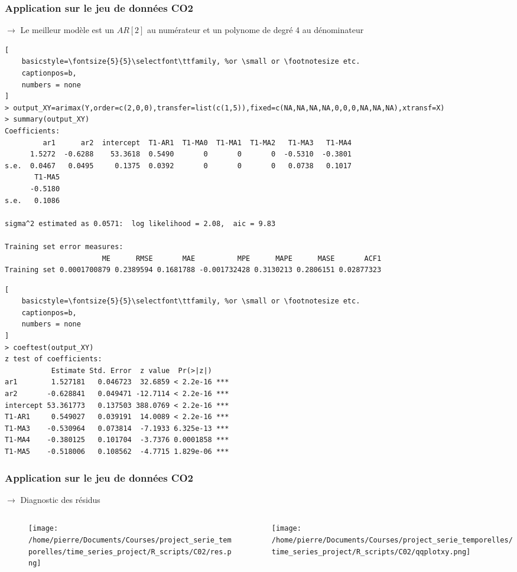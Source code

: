 \documentclass{presentation_template}
\begin{document}
\begin{frame}[fragile]
  \frametitle{Application sur le jeu de données CO2}

  $\rightarrow$ Le meilleur modèle est un $AR[2]$ au numérateur et un polynome de degré 4 au dénominateur
  \begin{lstlisting}[
    basicstyle=\fontsize{5}{5}\selectfont\ttfamily, %or \small or \footnotesize etc.
    captionpos=b,
    numbers = none
]
> output_XY=arimax(Y,order=c(2,0,0),transfer=list(c(1,5)),fixed=c(NA,NA,NA,NA,0,0,0,NA,NA,NA),xtransf=X)
> summary(output_XY)
Coefficients:
         ar1      ar2  intercept  T1-AR1  T1-MA0  T1-MA1  T1-MA2   T1-MA3   T1-MA4
      1.5272  -0.6288    53.3618  0.5490       0       0       0  -0.5310  -0.3801
s.e.  0.0467   0.0495     0.1375  0.0392       0       0       0   0.0738   0.1017
       T1-MA5
      -0.5180
s.e.   0.1086

sigma^2 estimated as 0.0571:  log likelihood = 2.08,  aic = 9.83

Training set error measures:
                       ME      RMSE       MAE          MPE      MAPE      MASE       ACF1
Training set 0.0001700879 0.2389594 0.1681788 -0.001732428 0.3130213 0.2806151 0.02877323
  \end{lstlisting}
  \begin{lstlisting}[
    basicstyle=\fontsize{5}{5}\selectfont\ttfamily, %or \small or \footnotesize etc.
    captionpos=b,
    numbers = none
]
> coeftest(output_XY)
z test of coefficients:
           Estimate Std. Error  z value  Pr(>|z|)    
ar1        1.527181   0.046723  32.6859 < 2.2e-16 ***
ar2       -0.628841   0.049471 -12.7114 < 2.2e-16 ***
intercept 53.361773   0.137503 388.0769 < 2.2e-16 ***
T1-AR1     0.549027   0.039191  14.0089 < 2.2e-16 ***
T1-MA3    -0.530964   0.073814  -7.1933 6.325e-13 ***
T1-MA4    -0.380125   0.101704  -3.7376 0.0001858 ***
T1-MA5    -0.518006   0.108562  -4.7715 1.829e-06 ***
  \end{lstlisting}

\end{frame}

\begin{frame}
  \frametitle{Application sur le jeu de données CO2}
  $\rightarrow$ Diagnostic des résidus
  \begin{columns}
    \begin{column}{0.5\textwidth}
      \begin{figure}
        \texttt{[image: /home/pierre/Documents/Courses/project\_serie\_temporelles/time\_series\_project/R\_scripts/C02/res.png]} 
      \end{figure}
    \end{column}
    \begin{column}{0.5\textwidth}
      \texttt{[image: /home/pierre/Documents/Courses/project\_serie\_temporelles/time\_series\_project/R\_scripts/C02/qqplotxy.png]} 
    \end{column}
  \end{columns}
\end{frame}
\end{document}
